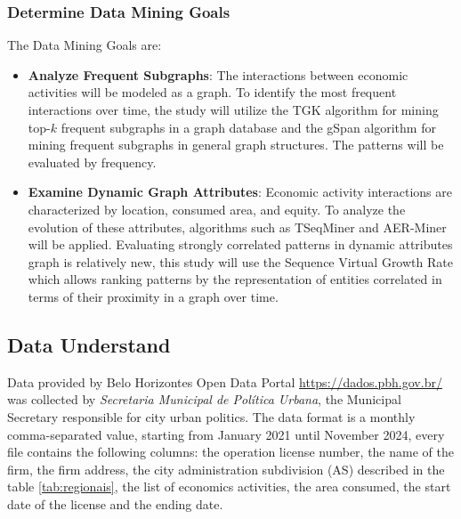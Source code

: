\documentclass[12pt]{article}
\begin{document}
\subsubsection{Determine Data Mining Goals}

The Data Mining Goals are:
\begin{itemize}
       
    \item \textbf{Analyze Frequent Subgraphs}: The interactions between economic activities will be modeled as a graph. To identify the most frequent interactions over time, the study will utilize the TGK algorithm \cite{fournier2019tkg} for mining top-\(k\) frequent subgraphs in a graph database and the gSpan algorithm \cite{yan2002gspan} for mining frequent subgraphs in general graph structures. The patterns will be evaluated by frequency.
    
    \item \textbf{Examine Dynamic Graph Attributes}: Economic activity interactions are characterized by location, consumed area, and equity. To analyze the evolution of these attributes, algorithms such as TSeqMiner \cite{fournier2019mining} and AER-Miner \cite{fournier2020mining} will be applied. Evaluating strongly correlated patterns in dynamic attributes graph is relatively new, this study will use the Sequence Virtual Growth Rate \cite{fournier2019mining} which allows ranking patterns by the representation of entities correlated in terms of their proximity in a graph over time.
    
\end{itemize}

\subsection{Data Understand}
Data provided by Belo Horizontes Open Data Portal \url{https://dados.pbh.gov.br/} was collected by 
\textit{Secretaria Municipal de Política Urbana}, the Municipal Secretary responsible for city urban politics. The data format is a monthly comma-separated value, starting from January 2021 until November 2024, every file contains the following columns: the operation license number, the name of the firm, the firm address, the city administration subdivision (AS) described in the table \ref{tab:regionais}, the list of economics activities, the area consumed, the start date of the license and the ending date.
\end{document}
